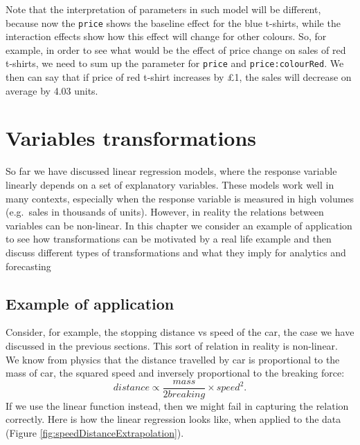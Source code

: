 \documentclass[
]{book}
\theoremstyle{definition}
\theoremstyle{definition}
\theoremstyle{definition}
\theoremstyle{definition}
\theoremstyle{remark}
\begin{document}
Note that the interpretation of parameters in such model will be different, because now the \texttt{price} shows the baseline effect for the blue t-shirts, while the interaction effects show how this effect will change for other colours. So, for example, in order to see what would be the effect of price change on sales of red t-shirts, we need to sum up the parameter for \texttt{price} and \texttt{price:colourRed}. We then can say that if price of red t-shirt increases by £1, the sales will decrease on average by 4.03 units.

\hypertarget{variablesTransformations}{%
\chapter{Variables transformations}\label{variablesTransformations}}

So far we have discussed linear regression models, where the response variable linearly depends on a set of explanatory variables. These models work well in many contexts, especially when the response variable is measured in high volumes (e.g.~sales in thousands of units). However, in reality the relations between variables can be non-linear. In this chapter we consider an example of application to see how transformations can be motivated by a real life example and then discuss different types of transformations and what they imply for analytics and forecasting

\hypertarget{example-of-application}{%
\section{Example of application}\label{example-of-application}}

Consider, for example, the stopping distance vs speed of the car, the case we have discussed in the previous sections. This sort of relation in reality is non-linear. We know from physics that the distance travelled by car is proportional to the mass of car, the squared speed and inversely proportional to the breaking force:
\begin{equation}
    distance \propto \frac{mass}{2 breaking} \times speed^2.
    \label{eq:speedDistanceFormula}
\end{equation}
If we use the linear function instead, then we might fail in capturing the relation correctly. Here is how the linear regression looks like, when applied to the data (Figure \ref{fig:speedDistanceExtrapolation}).
\end{document}
